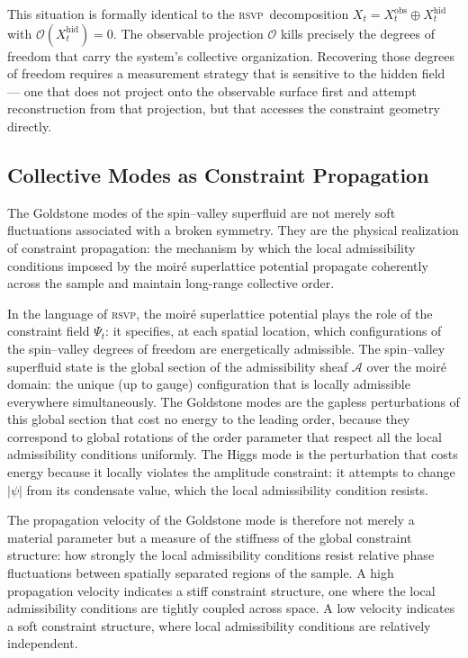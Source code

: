 \documentclass[11pt,a4paper]{article}
\theoremstyle{plain}
\theoremstyle{definition}
\theoremstyle{remark}
\newcommand{\RSVP}{\textup{\textsc{rsvp}}}
\newcommand{\scrA}{\mathscr{A}}
\begin{document}
This situation is formally identical to the \RSVP\ decomposition
$X_t = X_t^{\mathrm{obs}} \oplus X_t^{\mathrm{hid}}$ with
$\mathcal{O}(X_t^{\mathrm{hid}}) = 0$. The observable projection $\mathcal{O}$
kills precisely the degrees of freedom that carry the system's collective
organization. Recovering those degrees of freedom requires a measurement
strategy that is sensitive to the hidden field --- one that does not project
onto the observable surface first and attempt reconstruction from that
projection, but that accesses the constraint geometry directly.

\subsection{Collective Modes as Constraint Propagation}

The Goldstone modes of the spin--valley superfluid are not merely soft
fluctuations associated with a broken symmetry. They are the physical
realization of constraint propagation: the mechanism by which the local
admissibility conditions imposed by the moiré superlattice potential
propagate coherently across the sample and maintain long-range collective
order.

In the language of \RSVP, the moiré superlattice potential plays the role
of the constraint field $\Psi_t$: it specifies, at each spatial location,
which configurations of the spin--valley degrees of freedom are energetically
admissible. The spin--valley superfluid state is the global section of the
admissibility sheaf $\scrA$ over the moiré domain: the unique (up to gauge)
configuration that is locally admissible everywhere simultaneously. The
Goldstone modes are the gapless perturbations of this global section that
cost no energy to the leading order, because they correspond to global
rotations of the order parameter that respect all the local admissibility
conditions uniformly. The Higgs mode is the perturbation that costs energy
because it locally violates the amplitude constraint: it attempts to change
$|\psi|$ from its condensate value, which the local admissibility condition
resists.

The propagation velocity of the Goldstone mode is therefore not merely a
material parameter but a measure of the stiffness of the global constraint
structure: how strongly the local admissibility conditions resist relative
phase fluctuations between spatially separated regions of the sample. A
high propagation velocity indicates a stiff constraint structure, one where
the local admissibility conditions are tightly coupled across space. A low
velocity indicates a soft constraint structure, where local admissibility
conditions are relatively independent.
\end{document}
